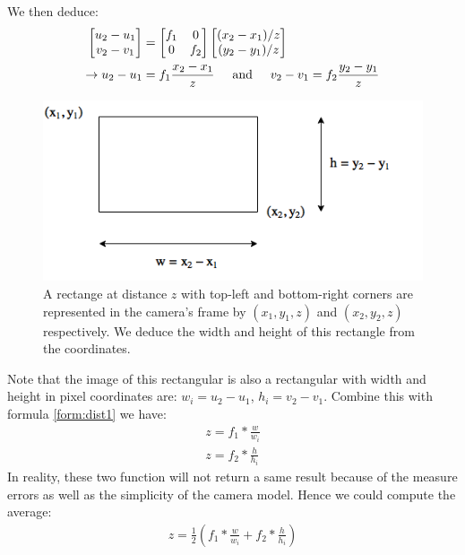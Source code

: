 We then deduce:
\begin{align}
	\begin{bmatrix}
		u_2 - u_1\\
		v_2 - v_1
	\end{bmatrix} &= \begin{bmatrix}
	f_1 & 0 \\
	0 & f_2 
\end{bmatrix} \begin{bmatrix}
(x_2 - x_1)/z\\
(y_2 - y_1)/z
\end{bmatrix} \nonumber\\
\label{form:dist1}
\rightarrow u_2 - u_1 &= f_1 \frac{x_2 - x_1}{z} \hspace{0.5cm} \text{and} \hspace{0.5cm} v_2 - v_1 = f_2 \frac{y_2 - y_1}{z} 
\end{align}

\begin{figure}[tb]
	\centering
	\includegraphics[width=0.6\hsize]{./figures/rectForm}
	\caption{A rectange at distance $z$ with top-left and bottom-right corners are represented in the camera's frame by $(x_1, y_1, z)$ and $(x_2, y_2, z)$ respectively. We deduce the width and height of this rectangle from the coordinates.}
	\label{fig:rectForm}
\end{figure}

Note that the image of this rectangular is also a rectangular with width and height in pixel coordinates are: $w_{i} = u_2 - u_1$, $h_{i} = v_2 - v_1$. Combine this with formula \ref{form:dist1} we have:
\begin{align}
\label{form:dist2}
z = f_1 * \frac{w}{w_i} \nonumber \\
z = f_2 * \frac{h}{h_i}
\end{align}
In reality, these two function will not return a same result because of the measure errors as well as the simplicity of the camera model. Hence we could compute the average:
\begin{align}
z = \frac{1}{2} (f_1 * \frac{w}{w_i} + f_2 * \frac{h}{h_i})
\label{form:distEst}
\end{align}

